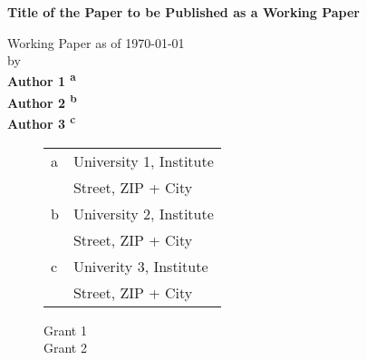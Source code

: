 \renewcommand*{\thefootnote}{\alph{footnote}}
\begin{titlepage}
\pagestyle{empty}
\begin{center}

    {\Large{\bf Title of the Paper to be Published as a Working Paper}} \vspace{0.5cm}


    {\normalsize Working Paper as of \today \\\vspace{0.5cm}
    by}\\\vspace{0.5cm}
    {\normalsize{\bf
    Author 1 \textsuperscript{a} \\
    Author 2 \textsuperscript{b} \\
    Author 3 \textsuperscript{c} }}\\\vspace{1.5cm}
   
	\begin{minipage}{0.9\textwidth}
	\begin{tcolorbox}[title=Abstract, fontupper = \footnotesize]
	\blindtext \blindtext
\end{tcolorbox}
	
	\end{minipage}

    
    \vfill
  \begin{figure}[!b]
    \centering
    \begin{minipage}{0.45\textwidth}
        \centering
        \begin{tcolorbox}[title=Affiliations, fontupper = \footnotesize]
        \begin{tabular}{ll}
        a & University 1, Institute \\
        & Street, ZIP + City \\
        b & University 2, Institute \\
        & Street, ZIP + City \\
        c & Univerity 3, Institute \\
        & Street, ZIP + City
        \end{tabular}
        \end{tcolorbox}
    \end{minipage}\hspace*{0.1 \textwidth}
    \begin{minipage}{0.35\textwidth}
       \centering
       \begin{tcolorbox}[title=Grants, fontupper = \footnotesize]
       Grant 1 \\
       Grant 2
       \end{tcolorbox}
    \end{minipage}
\end{figure}

\end{center}
\end{titlepage}
\renewcommand*{\thefootnote}{\arabic{footnote}}
\setcounter{footnote}{0}